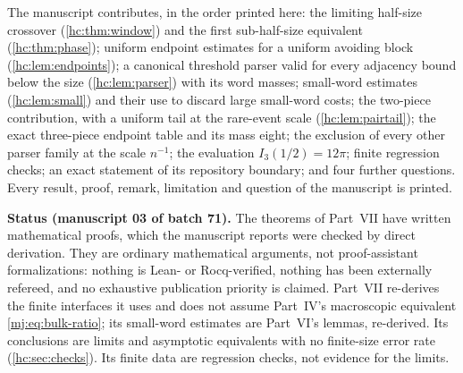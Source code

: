 \documentclass[11pt,a4paper]{article}
\theoremstyle{definition}\newaliascnt{definition}{theorem}
\theoremstyle{remark}\newaliascnt{remark}{theorem}
\begin{document}
The manuscript contributes, in the order printed here: the limiting
half-size crossover (\cref{hc:thm:window}) and the first sub-half-size
equivalent (\cref{hc:thm:phase}); uniform endpoint estimates for a uniform
avoiding block (\cref{hc:lem:endpoints}); a canonical threshold parser valid
for every adjacency bound below the size (\cref{hc:lem:parser}) with its word
masses; small-word estimates (\cref{hc:lem:small}) and their use to discard
large small-word costs; the two-piece contribution, with a uniform tail at
the rare-event scale (\cref{hc:lem:pairtail}); the exact three-piece endpoint
table and its mass eight; the exclusion of every other parser family at the
scale $n^{-1}$; the evaluation $I_3(1/2)=12\pi$; finite regression checks;
an exact statement of its repository boundary; and four further questions.
Every result, proof, remark, limitation and question of the manuscript is
printed.

\begin{resultbox}
\textbf{Status (manuscript 03 of batch 71).} The theorems of Part~VII have
written mathematical proofs, which the manuscript reports were checked by
direct derivation. They are ordinary mathematical arguments, not
proof-assistant formalizations: nothing is Lean- or Rocq-verified, nothing
has been externally refereed, and no exhaustive publication priority is
claimed. Part~VII re-derives the finite interfaces it uses and does not
assume Part~IV's macroscopic equivalent \eqref{mj:eq:bulk-ratio}; its
small-word estimates are Part~VI's lemmas, re-derived. Its conclusions are
limits and asymptotic equivalents with no finite-size error rate
(\cref{hc:sec:checks}). Its finite data are regression checks, not evidence
for the limits.
\end{resultbox}
\end{document}
